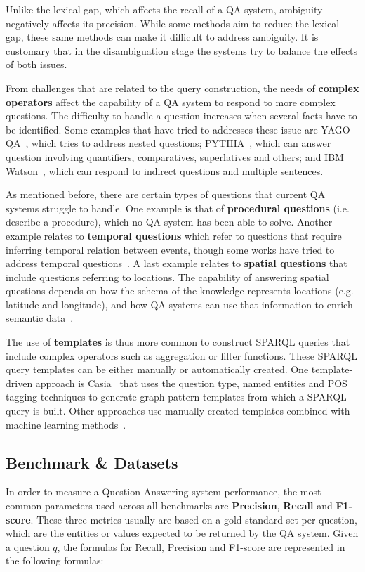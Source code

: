 Unlike the lexical gap, which affects the recall of a QA system, ambiguity negatively affects 
its precision. While some methods aim to reduce the lexical gap, these same methods can make it 
difficult to address ambiguity. It is customary that in the disambiguation stage the systems 
try to balance the effects of both issues.

From challenges that are related to the query construction, the needs of \textbf{complex operators} 
affect the capability of a QA system to respond to more complex questions. The difficulty to 
handle a question increases when several facts have to be identified. Some examples that have 
tried to addresses these issue are YAGO-QA~\cite{qa:AdolphsTSUW11}, which tries to address 
nested questions; PYTHIA~\cite{qa:UngerC11}, which can answer question involving quantifiers, 
comparatives, superlatives and others; and IBM Watson~\cite{qa:GliozzoK12}, which can respond 
to indirect questions and multiple sentences.

As mentioned before, there are certain types of questions that current QA systems struggle to 
handle. One example is that of \textbf{procedural questions} (i.e. describe a procedure), which 
no QA system has been able to solve. Another example relates to \textbf{temporal questions} 
which refer to questions that require inferring temporal relation between events, though some 
works have tried to address temporal questions~\cite{qa:Allen83,qa:FerrandezSKDFNITONMG11,
qa:MeloRN11}. A last example relates to \textbf{spatial questions} that include questions 
referring to locations. The capability of answering spatial questions depends on how the schema 
of the knowledge represents locations (e.g. latitude and longitude), and how QA systems can use 
that information to enrich semantic data~\cite{qa:YounisJTA12,qa:graph-2-ZouHWYHZ14}.

The use of \textbf{templates} is thus more common to construct SPARQL queries that include 
complex operators such as aggregation or filter functions. These SPARQL query templates can be 
either manually or automatically created. One template-driven approach is Casia~\cite{qa:shizhu2014casia} 
that uses the question type, named entities and POS tagging techniques to generate graph 
pattern templates from which a SPARQL query is built. Other approaches use manually created 
templates combined with machine learning methods~\cite{qa:AbachaZ12}. 

\subsection{Benchmark \& Datasets}
\label{cap2:qakg/benchmarkDatasets}
In order to measure a Question Answering system performance, the most common parameters used 
across all benchmarks are \textbf{Precision}, \textbf{Recall} and \textbf{F1-score}. These 
three metrics usually are based on a gold standard set per question, which are the entities or 
values expected to be returned by the QA system. Given a question $q$, the formulas for Recall, 
Precision and F1-score are represented in the following formulas:

